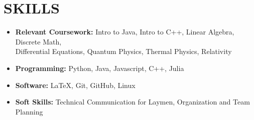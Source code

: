 \documentclass[a4paper,12pt]{extarticle}
\begin{document}
\section*{SKILLS}
\begin{itemize}
    \item \textbf{Relevant Coursework:} Intro to Java, Intro to C++, Linear Algebra, Discrete Math, \\
    \hspace{1cm} Differential Equations, Quantum Physics,
    Thermal Physics, Relativity
    \item \textbf{Programming:} Python, Java, Javascript, C++, Julia %
    \item \textbf{Software:} LaTeX, Git, GitHub, Linux %
    \item \textbf{Soft Skills:} Technical Communication for Laymen, Organization and Team Planning %
\end{itemize}

\end{document}
